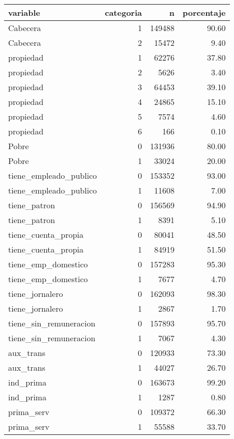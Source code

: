 \begin{table}[ht]
\centering
\begin{tabular}{lrrr}
  \toprule
variable & categoria & n & porcentaje \\ 
  \midrule
Cabecera &   1 & 149488 & 90.60 \\ 
  Cabecera &   2 & 15472 & 9.40 \\ 
  propiedad &   1 & 62276 & 37.80 \\ 
  propiedad &   2 & 5626 & 3.40 \\ 
  propiedad &   3 & 64453 & 39.10 \\ 
  propiedad &   4 & 24865 & 15.10 \\ 
  propiedad &   5 & 7574 & 4.60 \\ 
  propiedad &   6 & 166 & 0.10 \\ 
  Pobre &   0 & 131936 & 80.00 \\ 
  Pobre &   1 & 33024 & 20.00 \\ 
  tiene\_empleado\_publico &   0 & 153352 & 93.00 \\ 
  tiene\_empleado\_publico &   1 & 11608 & 7.00 \\ 
  tiene\_patron &   0 & 156569 & 94.90 \\ 
  tiene\_patron &   1 & 8391 & 5.10 \\ 
  tiene\_cuenta\_propia &   0 & 80041 & 48.50 \\ 
  tiene\_cuenta\_propia &   1 & 84919 & 51.50 \\ 
  tiene\_emp\_domestico &   0 & 157283 & 95.30 \\ 
  tiene\_emp\_domestico &   1 & 7677 & 4.70 \\ 
  tiene\_jornalero &   0 & 162093 & 98.30 \\ 
  tiene\_jornalero &   1 & 2867 & 1.70 \\ 
  tiene\_sin\_remuneracion &   0 & 157893 & 95.70 \\ 
  tiene\_sin\_remuneracion &   1 & 7067 & 4.30 \\ 
  aux\_trans &   0 & 120933 & 73.30 \\ 
  aux\_trans &   1 & 44027 & 26.70 \\ 
  ind\_prima &   0 & 163673 & 99.20 \\ 
  ind\_prima &   1 & 1287 & 0.80 \\ 
  prima\_serv &   0 & 109372 & 66.30 \\ 
  prima\_serv &   1 & 55588 & 33.70 \\ 

\end{tabular}
\end{table}
